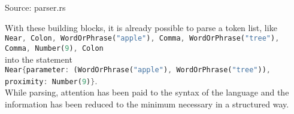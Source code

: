 \begin{codeenv}
    \label{code:parse-expr}
    
    \centerline{Source: parser.rs}
\end{codeenv}
With these building blocks, it is already possible to parse a token list, like\\
\lstinline[language=Rust]$Near, Colon, WordOrPhrase("apple"), Comma, WordOrPhrase("tree"), Comma, Number(9), Colon$\\
into the statement\\
\lstinline[language=Rust]$Near{parameter: (WordOrPhrase("apple"), WordOrPhrase("tree")), proximity: Number(9)}$.\\
While parsing, attention has been paid to the syntax of the language and the information has been reduced to the minimum necessary in a structured way.
